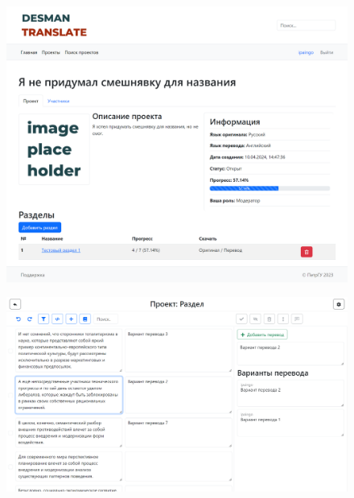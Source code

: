 \documentclass[hyperref={unicode}]{beamer}
\begin{document}
\begin{frame}
	\begin{figure}
	\includegraphics[height=\textheight]{images/project.png}
	\end{figure}
\end{frame}

\begin{frame}
	\begin{figure}
	\includegraphics[width=\textwidth]{images/editor.png}
	\end{figure}
\end{frame}
\end{document}
